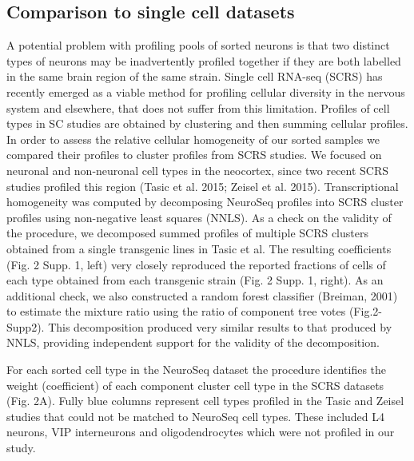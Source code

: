 \subsection{Comparison to single cell datasets}
A potential problem with profiling pools of sorted neurons is that two distinct types of neurons may be inadvertently profiled together if they are both labelled in the same brain region of the same strain. Single cell RNA-seq (SCRS) has recently emerged as a viable method for profiling cellular diversity in the nervous system and elsewhere, that does not suffer from this limitation. Profiles of cell types in SC studies are obtained by clustering and then summing cellular profiles. In order to assess the relative cellular homogeneity of our sorted samples we compared their profiles to cluster profiles from SCRS studies. We focused on neuronal and non-neuronal cell types in the neocortex, since two recent SCRS studies profiled this region (Tasic et al. 2015; Zeisel et al. 2015). Transcriptional homogeneity was computed by decomposing NeuroSeq profiles into SCRS cluster profiles using non-negative least squares (NNLS). As a check on the validity of the procedure, we decomposed summed profiles of multiple SCRS clusters obtained from a single transgenic lines in Tasic et al. The resulting coefficients (Fig. 2 Supp. 1, left) very closely reproduced the reported fractions of cells of each type obtained from each transgenic strain (Fig. 2 Supp. 1, right). As an additional check, we also constructed a random forest classifier (Breiman, 2001) to estimate the mixture ratio using the ratio of component tree votes (Fig.2-Supp2). This decomposition produced very similar results to that produced by NNLS, providing independent support for the validity of the decomposition. 

For each sorted cell type in the NeuroSeq dataset the procedure identifies the weight (coefficient) of each component cluster cell type in the SCRS datasets (Fig. 2A). Fully blue columns represent cell types profiled in the Tasic and Zeisel studies that could not be matched to NeuroSeq cell types. These included L4 neurons, VIP interneurons and oligodendrocytes which were not profiled in our study. 

